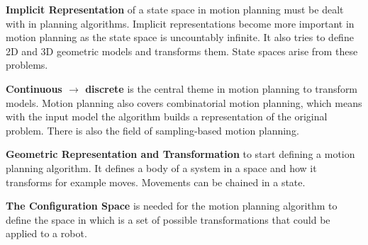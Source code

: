 \textbf{Implicit Representation} of a state space in motion planning must be dealt with in planning algorithms. Implicit representations become more important in motion planning as the state space is uncountably infinite. It also tries to define 2D and 3D geometric models and transforms them. State spaces arise from these problems. \cite{planning_algorithms_steven_m_lavalle}

\textbf{Continuous $\rightarrow$ discrete} is the central theme in motion planning to transform models. Motion planning also covers combinatorial motion planning, which means with the input model the algorithm builds a representation of the original problem. There is also the field of sampling-based motion planning. \cite{planning_algorithms_steven_m_lavalle}

\textbf{Geometric Representation and Transformation} to start defining a motion planning algorithm. It defines a body of a system in a space and how it transforms for example moves. Movements can be chained in a state. \cite{planning_algorithms_steven_m_lavalle}

\textbf{The Configuration Space} is needed for the motion planning algorithm to define the space in which is a set of possible transformations that could be applied to a robot. \cite{planning_algorithms_steven_m_lavalle}

